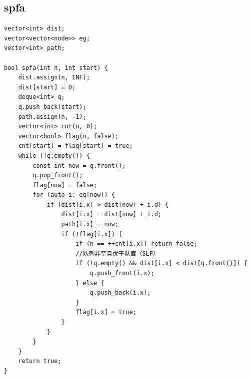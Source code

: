 \documentclass[twoside]{article}
\begin{document}
\subsection{spfa}
\begin{lstlisting}
vector<int> dist;
vector<vector<node>> eg;
vector<int> path;

bool spfa(int n, int start) {
    dist.assign(n, INF);
    dist[start] = 0;
    deque<int> q;
    q.push_back(start);
    path.assign(n, -1);
    vector<int> cnt(n, 0);
    vector<bool> flag(n, false);
    cnt[start] = flag[start] = true;
    while (!q.empty()) {
        const int now = q.front();
        q.pop_front();
        flag[now] = false;
        for (auto i: eg[now]) {
            if (dist[i.x] > dist[now] + i.d) {
                dist[i.x] = dist[now] + i.d;
                path[i.x] = now;
                if (!flag[i.x]) {
                    if (n == ++cnt[i.x]) return false;
                    //队列非空且优于队首（SLF）
                    if (!q.empty() && dist[i.x] < dist[q.front()]) {
                        q.push_front(i.x);
                    } else {
                        q.push_back(i.x);
                    }
                    flag[i.x] = true;
                }
            }
        }
    }
    return true;
}
\end{lstlisting}
\end{document}
